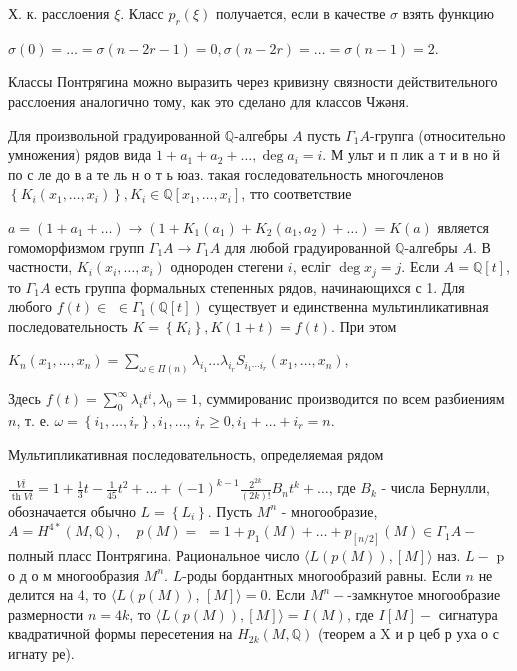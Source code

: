 \documentclass[10pt]{article}
\begin{document}
Х. к. расслоения $\xi$. Класс $p_{r}(\xi)$ получается, если в качестве $\sigma$ взять функцию



$\sigma(0)=\ldots=\sigma(n-2 r-1)=0, \sigma(n-2 r)=\ldots=\sigma(n-1)=2$.



Классы Понтрягина можно выразить через кривизну связности действительного расслоения аналогично тому, как это сделано для классов Чжәня.



Для произвольной градуированной $\mathbb{Q}$-алгебры $A$ пусть $\Gamma_{1} A$-групга (относительно умножения) рядов вида $1+a_{1}+a_{2}+\ldots, \operatorname{deg} a_{i}=i$. М ульт и п лик а т и в но й по с ле до в а те ль н о т ь юаз. такая госледовательность многочленов $\left\{K_{i}\left(x_{1}, \ldots, x_{i}\right)\right\}, K_{i} \in \mathbb{Q}\left[x_{1}, \ldots, x_{i}\right]$, тто соответствие



$a=\left(1+a_{1}+\ldots\right) \rightarrow\left(1+K_{1}\left(a_{1}\right)+K_{2}\left(a_{1}, a_{2}\right)+\ldots\right)=K(a)$ является гомоморфизмом групп $\Gamma_{1} A \longrightarrow \Gamma_{1} A$ для любой градуированной $\mathbb{Q}$-алгебры $A$. В частности, $K_{i}\left(x_{i}, \ldots, x_{i}\right)$ однороден стегени $i$, есліг $\operatorname{deg} x_{j}=j$. Если $A=\mathbb{Q}[t]$, то $\Gamma_{1} A$ есть группа формальных степенных рядов, начинающихся с 1. Для любого $f(t) \in$ $\in \Gamma_{1}(\mathbb{Q}[t])$ существует и единственна мультинликативная последовательность $K=\left\{K_{i}\right\}, K(1+t)=f(t)$. При этом



$K_{n}\left(x_{1}, \ldots, x_{n}\right)=\sum_{\omega \in \Pi(n)} \lambda_{i_{1}} \ldots \lambda_{i_{r}} S_{i_{1} \cdots i_{r}}\left(x_{1}, \ldots, x_{n}\right)$,



Здесь $f(t)=\sum_{0}^{\infty} \lambda_{i} t^{i}, \lambda_{0}=1$, суммированис производится по всем разбиениям $n$, т. е. $\omega=\left\{i_{1}, \ldots, i_{r}\right\}, i_{1}, \ldots$, $i_{r} \geqslant 0, i_{1}+\ldots+i_{r}=n$.



Мультипликативная последовательность, определяемая рядом



$\frac{V \bar{t}}{\operatorname{th} V \bar{t}}=1+\frac{1}{3} t-\frac{1}{45} t^{2}+\ldots+(-1)^{k-1} \frac{2^{2 k}}{(2 k) !} B_{n} t^{k}+\ldots$, где $B_{k}$ - числа Бернулли, обозначается обычно $L=\left\{L_{i}\right\}$. Пусть $M^{n}$ - многообразие, $A=H^{4 *}(M, \mathbb{Q}), \quad p(M)=$ $=1+p_{1}(M)+\ldots+p_{[n / 2]}(M) \in \Gamma_{1} A-$ полный пласс Понтрягина. Рациональное число $\langle L(p(M)),[M]\rangle$ наз. $L-$ p о д о м многообразия $M^{n}$. $L$-роды бордантных многообразий равны. Если $n$ не делится на 4, то $\langle L(p(M))$, $[M]\rangle=0$. Если $M^{n}-$-замкнутое многообразие размерности $n=4 k$, то $\langle L(p(M)),[M]\rangle=I(M)$, где $I[M]-$ сигнатура квадратичной формы пересетения на $H_{2 k}(M, \mathbb{Q})$ (теорем а X и р цеб р уха о с игнату ре).
\end{document}
